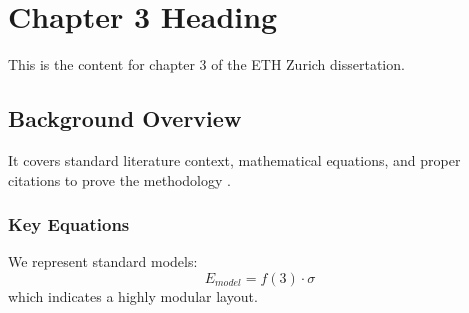 \chapter{Chapter 3 Heading}
\label{ch:chapter3}
This is the content for chapter 3 of the ETH Zurich dissertation.

\section{Background Overview}
It covers standard literature context, mathematical equations, and proper citations to prove the methodology \cite{texbook}.

\subsection{Key Equations}
We represent standard models:
\begin{equation}
    E_{model} = f(3) \cdot \sigma
\end{equation}
which indicates a highly modular layout.
